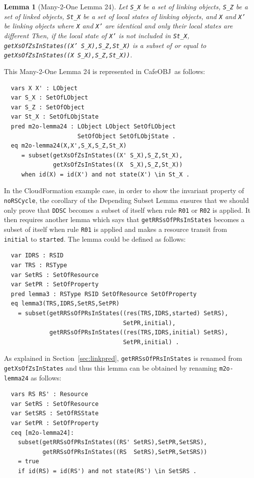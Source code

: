 \documentclass[12pt]{report}
\newtheorem{lemma}{Lemma}
\newcommand{\stt}[1]{{\small{\tt {#1}}}}
\newcommand{\cafeobj}{{\sf CafeOBJ}~}
\begin{document}
\begin{lemma}[Many-2-One Lemma 24]
  Let {\tt S\_X} be a set of linking objects, {\tt S\_Z} be a set of
  linked objects, {\tt St\_X} be a set of local states of linking
  objects, and {\tt X} and {\tt X'} be linking objects where {\tt X}
  and {\tt X'} are identical and only their local states are different
  Then, if the local state of {\tt X'} is not included in {\tt St\_X},
  \stt{getXsOfZsInStates((X' S\_X),S\_Z,St\_X)} is a subset of or equal to
  \stt{getXsOfZsInStates((X S\_X),S\_Z,St\_X))}.
\end{lemma}
This Many-2-One Lemma 24 is represented in \cafeobj as follows:
\small
\begin{verbatim}
  vars X X' : LObject
  var S_X : SetOfLObject
  var S_Z : SetOfObject
  var St_X : SetOfLObjState
  pred m2o-lemma24 : LObject LObject SetOfLObject
                     SetOfObject SetOfLObjState .
  eq m2o-lemma24(X,X',S_X,S_Z,St_X)
     = subset(getXsOfZsInStates((X' S_X),S_Z,St_X),
              getXsOfZsInStates((X  S_X),S_Z,St_X))
     when id(X) = id(X') and not state(X') \in St_X .
\end{verbatim}
\normalsize
In the CloudFormation example case, in order to show the invariant
property of {\tt noRSCycle}, the corollary of the Depending Subset
Lemma ensures that we should only prove that {\tt DDSC} becomes a
subset of itself when rule {\tt R01} or {\tt R02} is applied. It then
requires another lemma which says that {\tt getRRSsOfPRsInStates}
becomes a subset of itself when rule {\tt R01} is applied and makes a
resource transit from {\tt initial} to {\tt started}.  The lemma could
be defined as follows:
\small
\begin{verbatim}
  var IDRS : RSID 
  var TRS : RSType
  var SetRS : SetOfResource
  var SetPR : SetOfProperty
  pred lemma3 : RSType RSID SetOfResource SetOfProperty
  eq lemma3(TRS,IDRS,SetRS,SetPR)
    = subset(getRRSsOfPRsInStates((res(TRS,IDRS,started) SetRS),
                                  SetPR,initial), 
             getRRSsOfPRsInStates((res(TRS,IDRS,initial) SetRS),
                                  SetPR,initial) .
\end{verbatim}
\normalsize
As explained in Section~\ref{sec:linkpred}, {\tt getRRSsOfPRsInStates}
is renamed from {\tt getXsOfZsInStates} and thus this lemma can be obtained
by renaming {\tt m2o-lemma24} as follows:
\small
\begin{verbatim}
  vars RS RS' : Resource
  var SetRS : SetOfResource
  var SetSRS : SetOfRSState
  var SetPR : SetOfProperty
  ceq [m2o-lemma24]:
    subset(getRRSsOfPRsInStates((RS' SetRS),SetPR,SetSRS),
           getRRSsOfPRsInStates((RS  SetRS),SetPR,SetSRS))
    = true
    if id(RS) = id(RS') and not state(RS') \in SetSRS .
\end{verbatim}
\normalsize
\end{document}
